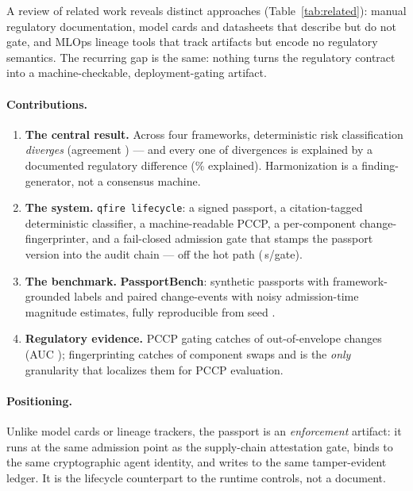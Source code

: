 \documentclass[11pt]{article}
\begin{document}
A review of related work reveals distinct approaches (Table~\ref{tab:related}): manual
regulatory documentation, model cards and datasheets that describe but do not gate,
and MLOps lineage tools that track artifacts but encode no regulatory semantics. The
recurring gap is the same: nothing turns the regulatory contract into a
machine-checkable, deployment-gating artifact.

\paragraph{Contributions.}
\begin{enumerate}
  \item \textbf{The central result.} Across four frameworks, deterministic risk
  classification \emph{diverges} (agreement \Hca) --- and every one of \NumDiverge{}
  divergences is explained by a documented regulatory difference
  (\PctExplained\% explained). Harmonization is a finding-generator, not a consensus
  machine.
  \item \textbf{The system.} \texttt{qfire lifecycle}: a signed passport, a
  citation-tagged deterministic classifier, a machine-readable PCCP, a per-component
  change-fingerprinter, and a fail-closed admission gate that stamps the passport
  version into the audit chain --- off the hot path (\GateMedian\,\textmu s/gate).
  \item \textbf{The benchmark.} \textbf{PassportBench}: \NumPassports{} synthetic
  passports with framework-grounded labels and \NumChanges{} paired change-events with
  noisy admission-time magnitude estimates, fully reproducible from seed \Seed.
  \item \textbf{Regulatory evidence.} PCCP gating catches \Pgd{} of out-of-envelope
  changes (AUC \PccpAUC); fingerprinting catches \Cfd{} of component swaps and is the
  \emph{only} granularity that localizes them for PCCP evaluation.
\end{enumerate}

\paragraph{Positioning.} Unlike model cards or lineage trackers, the passport is an
\emph{enforcement} artifact: it runs at the same admission point as the supply-chain
attestation gate, binds to the same cryptographic agent identity, and writes to the
same tamper-evident ledger. It is the lifecycle counterpart to the runtime controls,
not a document.
\end{document}
